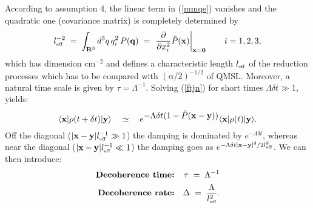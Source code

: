\documentclass[12pt]{article}
\begin{document}
According to assumption 4, the linear term in (\ref{mmqe}) vanishes
and the quadratic one (covariance matrix) is completely determined
by
\begin{equation}
l^{-2}_{\makebox{\tiny eff}} \; = \; \int_{{\bf R}^{3}} d^{3}q\,
q_{i}^{2}\, P({\bf q}) \; = \; \left. \frac{\partial}{\partial
x_{i}^{2}} \hat{P}({\bf x}) \right|_{{\bf x} = {\bf 0}} \qquad i =
1,2,3,
\end{equation}
which has dimension cm${}^{-2}$ and defines a characteristic
length $l_{\makebox{\tiny eff}}$ of the reduction processes which has  to
be compared with $(\alpha/2)^{-1/2}$ of QMSL. Moreover, a natural
time scale is given by $\tau = \Lambda^{-1}$. Solving (\ref{ftjn})
for short times $\Lambda \delta t \gg 1$, yields:
\begin{equation}
\langle {\bf x}| \rho(t + \delta t) |{\bf y} \rangle \quad \simeq
\quad e^{\displaystyle -\Lambda \delta t (1 - \hat{P}({\bf x} -
{\bf y}))}\langle {\bf x}| \rho(t) |{\bf y} \rangle.
\end{equation}
Off the diagonal ($|{\bf x} - {\bf y}|l^{-1}_{\makebox{\tiny eff}}
\gg 1$) the damping is dominated by $e^{-\Lambda \delta t}$,
whereas near the diagonal ($|{\bf x} - {\bf
y}|l^{-1}_{\makebox{\tiny eff}} \ll 1$) the damping goes as
$e^{-\Lambda \delta t |{\bf x} - {\bf y}|^{2} / 2
l^{2}_{\makebox{\tiny eff}}}$. We can then introduce:
\begin{eqnarray} \label{ctqmsl}
\makebox{\bf Decoherence time:} & & \tau  \; = \; \Lambda^{-1} \\
\makebox{\bf Decoherence rate:} & & \Delta \; = \;
\frac{\Lambda}{l^{2}_{\makebox{\tiny eff}}}.
\end{eqnarray}
\end{document}
